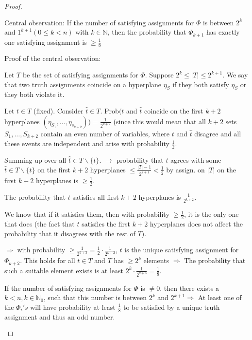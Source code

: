 \documentclass[11pt]{article}
\theoremstyle{definition}
\theoremstyle{definition}
\begin{document}
\begin{proof}
\begin{enumerate}
	Central observation: If the number of satisfying assignments for $ \Phi $ is between $ 2^k $ and $1^{k + 1} (0 \leq k < n) $ with $ k \in \mathbb{N} $, then the probability that $ \Phi_{k + 1} $ has exactly one satisfying assignment is $ \geq \frac{1}{8} $
	
	Proof of the central observation:
	
	Let $ T $ be the set of satisfying assignments for $ \Phi $. Suppose $ 2^k \leq |T| \leq 2^{k + 1} $. We say that two truth assignments coincide on a hyperplane $ \eta_S $ if they both satisfy $ \eta_S $ or they both violate it.
	
	Let $ t \in T $ (fixed). Consider $ \hat t \in T $. Prob$( t $ and $ \hat t $ coincide on the first $ k + 2 $ hyperplanes $(\eta_{S_1}, \dots, \eta_{s_{k+2}})) = \frac{1}{2^{k+2}} $ (since this would mean that all $ k + 2 $ sets $ S_1, \dots, S_{k + 2} $ contain an even number of variables, where $ t $ and $ \hat t $ disagree and all these events are independent and arise with probability $ \frac{1}{2} $.
	
	Summing up over all $ \hat t \in T \backslash \{ t \} $. $ \rightarrow $ probability that $ t $ agrees with some $ \hat t \in T \backslash \{ t \} $ on the first $ k + 2 $ hyperplanes $ \leq \frac{|T| - 1}{2^{k+1}} < \frac{1}{2} $ by assign. on $ | T | $ on the first $ k + 2 $ hyperplanes is $ \geq \frac{1}{2} $.
	
	The probability that $ t $ satisfies all first $ k + 2 $ hyperplanes is $ \frac{1}{2^{k + 2}} $.
	
	We know that if it satisfies them, then with probability $ \geq \frac{1}{2} $, it is the only one that does (the fact that $ t $ satisfies the first $ k + 2 $ hyperplanes does not affect the probability that it disagrees with the rest of $ T $).
	
	$ \Rightarrow $ with probability $ \geq \frac{1}{2^{k + 3}} = \frac{1}{2} \cdot \frac{1}{2^{k + 2}} $, $ t $ is the unique satisfying assignment for $ \Phi_{k + 2} $. This holds for all $ t \in T $ and $ T $ has $ \geq 2^k $ elements $ \Rightarrow $ The probability that such a suitable element exists is at least $ 2^k \cdot \frac{1}{2^{k + 3}} = \frac{1}{8} $.
	
	If the number of satisfying assignments for $ \Phi $ is $ \neq 0 $, then there exists a $ k < n, k \in \mathbb{N}_0 $, such that this number is between $ 2^k $ and $ 2^{k + 1} \Rightarrow $ At least one of the $ \Phi_i's $ will have probability at least $ \frac{1}{8} $ to be satisfied by a unique truth assignment and thus an odd number.

\end{enumerate}
\end{proof}
\end{document}
